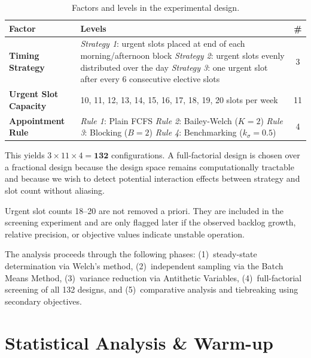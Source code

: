 \documentclass[12pt, a4paper]{article}
\newcommand{\headerrow}{\rowcolor{ugblue}\color{white}}
\newcommand{\altrow}{\rowcolor{rowgray}}
\begin{document}
\begin{table}[ht]
\centering
\caption{Factors and levels in the experimental design.}
\label{tab:factors}
\small
\begin{tabular}{>{\bfseries}p{3.2cm} p{9.8cm} c}
\toprule
\headerrow \textbf{Factor} & \textbf{Levels} & \textbf{\#} \\
\midrule
Timing Strategy &
  \textit{Strategy 1}: urgent slots placed at end of each morning/afternoon block \newline
  \textit{Strategy 2}: urgent slots evenly distributed over the day \newline
  \textit{Strategy 3}: one urgent slot after every 6 consecutive elective slots & 3 \\
\altrow Urgent Slot Capacity & 10, 11, 12, 13, 14, 15, 16, 17, 18, 19, 20 slots per week & 11 \\
Appointment Rule &
  \textit{Rule 1}: Plain FCFS \newline
  \textit{Rule 2}: Bailey-Welch ($K=2$) \newline
  \textit{Rule 3}: Blocking ($B=2$) \newline
  \textit{Rule 4}: Benchmarking ($k_\sigma = 0.5$) & 4 \\
\bottomrule
\end{tabular}
\end{table}

This yields $3 \times 11 \times 4 = \mathbf{132}$ configurations. A full-factorial design is chosen over a fractional design because the design space remains computationally tractable and because we wish to detect potential interaction effects between strategy and slot count without aliasing.

Urgent slot counts 18--20 are not removed a priori. They are included in the screening experiment and are only flagged later if the observed backlog growth, relative precision, or objective values indicate unstable operation.

The analysis proceeds through the following phases: (1)~steady-state determination via Welch's method, (2)~independent sampling via the Batch Means Method, (3)~variance reduction via Antithetic Variables, (4)~full-factorial screening of all 132 designs, and (5)~comparative analysis and tiebreaking using secondary objectives.

\section{Statistical Analysis \& Warm-up}
\end{document}
